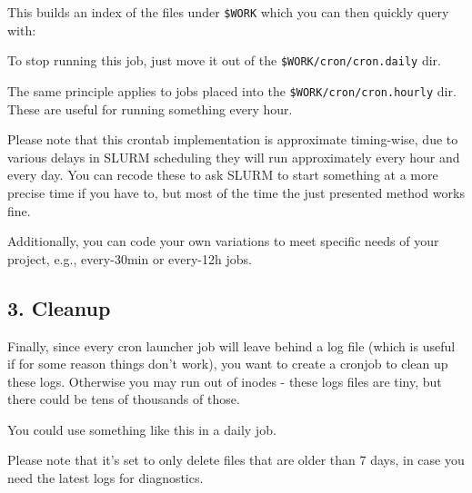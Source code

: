 \documentclass[
]{report}
\newenvironment{Shaded}{\begin{snugshade}}{\end{snugshade}}
\newcommand{\AttributeTok}[1]{\textcolor[rgb]{0.40,0.45,0.13}{#1}}
\newcommand{\ExtensionTok}[1]{\textcolor[rgb]{0.00,0.23,0.31}{#1}}
\newcommand{\FunctionTok}[1]{\textcolor[rgb]{0.28,0.35,0.67}{#1}}
\newcommand{\NormalTok}[1]{\textcolor[rgb]{0.00,0.23,0.31}{#1}}
\newcommand{\StringTok}[1]{\textcolor[rgb]{0.13,0.47,0.30}{#1}}
\newcommand{\VariableTok}[1]{\textcolor[rgb]{0.07,0.07,0.07}{#1}}
\begin{document}
This builds an index of the files under \texttt{\$WORK} which you can
then quickly query with:

\begin{Shaded}
\end{Shaded}

To stop running this job, just move it out of the
\texttt{\$WORK/cron/cron.daily} dir.

The same principle applies to jobs placed into the
\texttt{\$WORK/cron/cron.hourly} dir. These are useful for running
something every hour.

Please note that this crontab implementation is approximate timing-wise,
due to various delays in SLURM scheduling they will run approximately
every hour and every day. You can recode these to ask SLURM to start
something at a more precise time if you have to, but most of the time
the just presented method works fine.

Additionally, you can code your own variations to meet specific needs of
your project, e.g., every-30min or every-12h jobs.

\subsection{3. Cleanup}\label{cleanup}

Finally, since every cron launcher job will leave behind a log file
(which is useful if for some reason things don't work), you want to
create a cronjob to clean up these logs. Otherwise you may run out of
inodes - these logs files are tiny, but there could be tens of thousands
of those.

You could use something like this in a daily job.

\begin{Shaded}
\end{Shaded}

Please note that it's set to only delete files that are older than 7
days, in case you need the latest logs for diagnostics.
\end{document}
